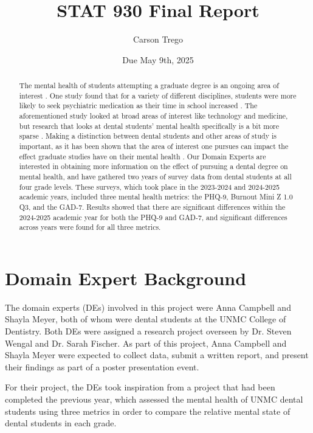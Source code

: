 \documentclass{article}
\title{STAT 930 Final Report}
\author{Carson Trego}
\date{Due May 9th, 2025}
\begin{document}
\maketitle

\begin{abstract}
    The mental health of students attempting a graduate degree is an ongoing area of interest \cite{ada2021wellbeing} \cite{bergvall2024impact}. One study found that for a variety of different disciplines, students were more likely to seek psychiatric medication as their time in school increased \cite{bergvall2024impact}. The aforementioned study looked at broad areas of interest like technology and medicine, but research that looks at dental students' mental health specifically is a bit more sparse \cite{bergvall2024impact}. Making a distinction between dental students and other areas of study is important, as it has been shown that the area of interest one pursues can impact the effect graduate studies have on their mental health \cite{bergvall2024impact}. Our Domain Experts are interested in obtaining more information on the effect of pursuing a dental degree on mental health, and have gathered two years of survey data from dental students at all four grade levels. These surveys, which took place in the 2023-2024 and 2024-2025 academic years, included three mental health metrics: the PHQ-9, Burnout Mini Z 1.0 Q3, and the GAD-7. Results showed that there are significant differences within the 2024-2025 academic year for both the PHQ-9 and GAD-7, and significant differences across years were found for all three metrics.
\end{abstract}

\section{Domain Expert Background}

The domain experts (DEs) involved in this project were Anna Campbell and Shayla Meyer, both of whom were dental students at the UNMC College of Dentistry. Both DEs were assigned a research project overseen by Dr. Steven Wengal and Dr. Sarah Fischer. As part of this project, Anna Campbell and Shayla Meyer were expected to collect data, submit a written report, and present their findings as part of a poster presentation event.

For their project, the DEs took inspiration from a project that had been completed the previous year, which assessed the mental health of UNMC dental students using three metrics in order to compare the relative mental state of dental students in each grade. 
\end{document}
